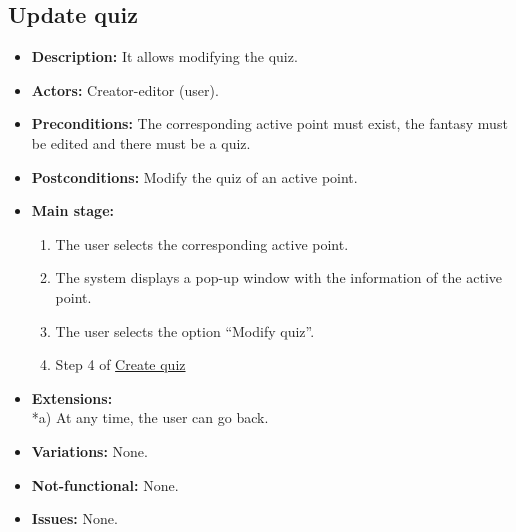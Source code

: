 \subsection{Update quiz}
\begin{itemize}
	\item \textbf{Description:} It allows modifying the quiz.
	\item \textbf{Actors:} Creator-editor (user).
	\item \textbf{Preconditions:} The corresponding active point must exist, the fantasy must be edited and there must be a quiz.
	\item \textbf{Postconditions:} Modify the quiz of an active point.
	\item \textbf{Main stage:}
	\begin{enumerate}
		\item The user selects the corresponding active point.
		\item The system displays a pop-up window with the information of the active point.
		\item The user selects the option ``Modify quiz''.
		\item Step 4 of \hyperlink{crearquiz} {Create quiz}
	\end{enumerate}
	\item \textbf{Extensions:} \\ *a) At any time, the user can go back.
	\item \textbf{Variations:} None.
	\item \textbf{Not-functional:} None.
	\item \textbf{Issues:} None.
\end{itemize}

